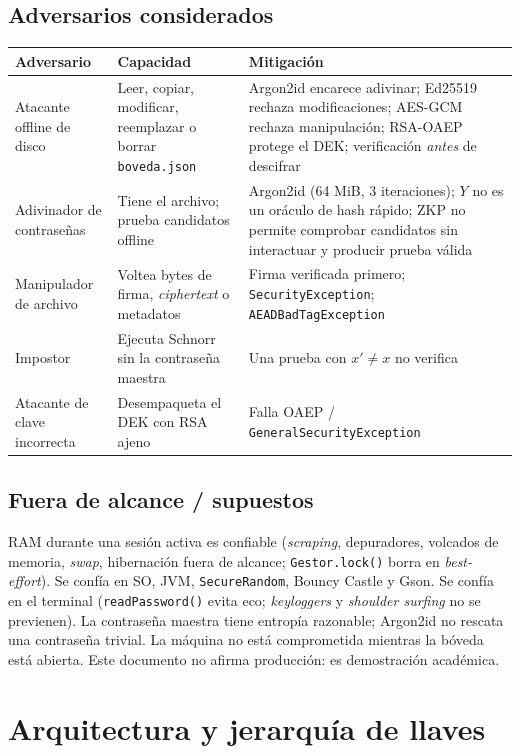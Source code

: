 \documentclass[11pt,a4paper]{article}
\begin{document}
\subsection{Adversarios considerados}
\begin{longtable}{@{}p{3.4cm}p{4.2cm}p{6.6cm}@{}}
\toprule
Adversario & Capacidad & Mitigación \\
\midrule
Atacante offline de disco & Leer, copiar, modificar, reemplazar o borrar \texttt{boveda.json} & Argon2id encarece adivinar; Ed25519 rechaza modificaciones; AES-GCM rechaza manipulación; RSA-OAEP protege el DEK; verificación \emph{antes} de descifrar \\
Adivinador de contraseñas & Tiene el archivo; prueba candidatos offline & Argon2id (64 MiB, 3 iteraciones); $Y$ no es un oráculo de hash rápido; ZKP no permite comprobar candidatos sin interactuar y producir prueba válida \\
Manipulador de archivo & Voltea bytes de firma, \emph{ciphertext} o metadatos & Firma verificada primero; \texttt{SecurityException}; \texttt{AEADBadTagException} \\
Impostor & Ejecuta Schnorr sin la contraseña maestra & Una prueba con $x' \neq x$ no verifica \\
Atacante de clave incorrecta & Desempaqueta el DEK con RSA ajeno & Falla OAEP / \texttt{GeneralSecurityException} \\
\bottomrule
\end{longtable}

\subsection{Fuera de alcance / supuestos}
RAM durante una sesión activa es confiable (\emph{scraping}, depuradores, volcados
de memoria, \emph{swap}, hibernación fuera de alcance; \texttt{Gestor.lock()} borra
en \emph{best-effort}). Se confía en SO, JVM, \texttt{SecureRandom}, Bouncy Castle
y Gson. Se confía en el terminal (\texttt{readPassword()} evita eco; \emph{keyloggers}
y \emph{shoulder surfing} no se previenen). La contraseña maestra tiene entropía
razonable; Argon2id no rescata una contraseña trivial. La máquina no está
comprometida mientras la bóveda está abierta. Este documento no afirma
producción: es demostración académica.

\section{Arquitectura y jerarquía de llaves}
\end{document}
